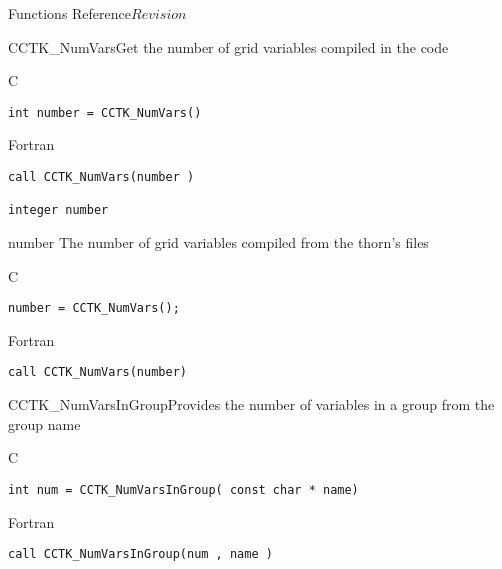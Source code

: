 \begin{cactuspart}{ Functions Reference}{}{$Revision$}
\begin{FunctionDescription}{CCTK\_NumVars}{Get the number of grid variables compiled in the code}
\label{CCTK-NumVars}
\begin{SynopsisSection}
\begin{Synopsis}{C}
\begin{verbatim}int number = CCTK_NumVars()\end{verbatim}
\end{Synopsis}
\begin{Synopsis}{Fortran}
\begin{verbatim}call CCTK_NumVars(number )

integer number\end{verbatim}
\end{Synopsis}
\end{SynopsisSection}
\begin{ParameterSection}
\begin{Parameter}{number}
The number of grid variables compiled from the thorn's  files
\end{Parameter}
\end{ParameterSection}

\begin{ExampleSection}
\begin{Example}{C}
\begin{verbatim}
number = CCTK_NumVars();
\end{verbatim}
\end{Example}
\begin{Example}{Fortran}
\begin{verbatim}
call CCTK_NumVars(number)
\end{verbatim}
\end{Example}
\end{ExampleSection}
\end{FunctionDescription}




\begin{FunctionDescription}{CCTK\_NumVarsInGroup}{Provides the number of variables in a group from the group name}
\label{CCTK-NumVarsInGroup}
\begin{SynopsisSection}
\begin{Synopsis}{C}
\begin{verbatim}int num = CCTK_NumVarsInGroup( const char * name)\end{verbatim}
\end{Synopsis}
\begin{Synopsis}{Fortran}
\begin{verbatim}call CCTK_NumVarsInGroup(num , name )


\end{verbatim}
\end{Synopsis}
\end{SynopsisSection}
\end{FunctionDescription}
\end{cactuspart}
